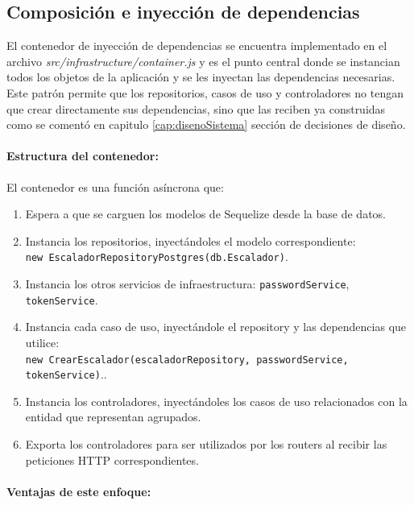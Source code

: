 \subsection{Composición e inyección de dependencias}

El contenedor de inyección de dependencias se encuentra implementado en el archivo \textit{src/infrastructure/container.js} y es el punto central donde se instancian todos los objetos de la aplicación y se les inyectan las dependencias necesarias. Este patrón permite que los repositorios, casos de uso y controladores no tengan que crear directamente sus dependencias, sino que las reciben ya construidas como se comentó en capitulo \ref{cap:disenoSistema} sección de decisiones de diseño.

\paragraph{\textbf{Estructura del contenedor:}}

El contenedor es una función asíncrona que:

\begin{enumerate}
  \item Espera a que se carguen los modelos de Sequelize desde la base de datos.
  \item Instancia los repositorios, inyectándoles el modelo correspondiente:\\ \texttt{new EscaladorRepositoryPostgres(db.Escalador)}.
  \item Instancia los otros servicios de infraestructura: \texttt{passwordService}, \texttt{tokenService}.
  \item Instancia cada caso de uso, inyectándole el repository y las dependencias que utilice:\\ \texttt{new CrearEscalador(escaladorRepository, passwordService, tokenService)}..
  \item Instancia los controladores, inyectándoles los casos de uso relacionados con la entidad que representan agrupados.
  \item Exporta los controladores para ser utilizados por los routers al recibir las peticiones HTTP correspondientes.
\end{enumerate}

\paragraph{Ventajas de este enfoque:}

